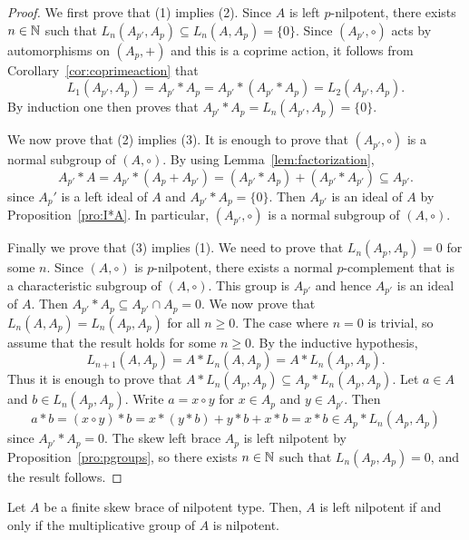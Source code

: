 \begin{proof}
    We first prove that (1) implies (2). Since $A$ is left $p$-nilpotent,
    there exists $n\in\mathbb{N}$ such that 
    $L_n(A_{p'},A_p)\subseteq L_n(A,A_p)=\{0\}$.
    Since $(A_{p'},\circ)$ acts by automorphisms on $(A_{p},+)$ and this is a coprime action, it follows from Corollary~\ref{cor:coprimeaction} that 
    \[
    L_1(A_{p'},A_p)=A_{p'}*A_p=A_{p'}*(A_{p'}*A_p)=L_2(A_{p'},A_p).
    \]
    By induction one then proves that $A_{p'}*A_p=L_n(A_{p'},A_p)=\{0\}$.
    
    We now prove that (2) implies (3). It is enough to prove that $(A_{p'},\circ)$ 
    is a normal subgroup of $(A,\circ)$. By using Lemma~\ref{lem:factorization},  
    \[
    A_{p'}*A=A_{p'}*(A_p+A_{p'})=(A_{p'}*A_p)+(A_{p'}*A_{p'})\subseteq A_{p'}.
    \]
    since $A_p'$ is a left ideal of $A$ and $A_{p'}*A_p=\{0\}$. Then 
    $A_{p'}$ is an ideal of $A$ by Proposition~\ref{pro:I*A}. In particular, $(A_{p'},\circ)$ is a normal subgroup of $(A,\circ)$. 
    
    Finally we prove that (3) implies (1). We need to prove that $L_n(A_p,A_p)=0$ for some $n$. Since $(A,\circ)$ is $p$-nilpotent, 
    there exists a normal $p$-complement that is a characteristic subgroup of $(A,\circ)$. This group is $A_{p'}$ and hence $A_{p'}$ is an ideal of $A$. Then
    $A_{p'}*A_p\subseteq A_{p'}\cap A_p=0$. We now prove that
    $L_n(A,A_p)=L_n(A_p,A_p)$ for all $n\geq0$. The case where $n=0$ is trivial, so assume that the result holds for some $n\geq0$. By the inductive hypothesis,
    \[
    L_{n+1}(A,A_p)=A*L_n(A,A_p)=A*L_n(A_p,A_p).
    \]
    Thus it is enough to prove that $A*L_n(A_p,A_p)\subseteq A_p*L_n(A_p,A_p)$. Let $a\in A$ and $b\in L_n(A_p,A_p)$. Write $a=x\circ y$ for $x\in A_p$ and $y\in A_{p'}$. Then
    \[
    a*b=(x\circ y)*b=x*(y*b)+y*b+x*b=x*b\in A_p*L_n(A_p,A_p)
    \]
    since $A_{p'}*A_p=0$. The skew left brace $A_p$ is left nilpotent
    by Proposition~\ref{pro:pgroups}, so there exists $n\in\mathbb{N}$ such that $L_n(A_p,A_p)=0$, and the result follows. 
\end{proof}


\begin{theorem}\label{thm:Smoktuwonicz}
Let $A$ be a finite skew brace of nilpotent type. Then, $A$ is left nilpotent if and only if the multiplicative group of $A$ is nilpotent.
\end{theorem}

